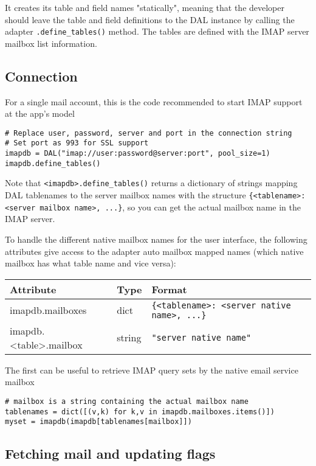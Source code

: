 \documentclass[justified,sixbynine,notoc]{tufte-book}
\def\ft{\small\tt}
\begin{document}
\begin{fullwidth}
It creates its table and field names "statically", meaning that the developer should leave the table and field definitions to the DAL instance by calling the adapter {\ft .define\_tables()} method. The tables are defined with the IMAP server mailbox list information.

\goodbreak\subsection{Connection}

For a single mail account, this is the code recommended to start IMAP support at the app's model

\begin{lstlisting}
# Replace user, password, server and port in the connection string
# Set port as 993 for SSL support
imapdb = DAL("imap://user:password@server:port", pool_size=1)
imapdb.define_tables()
\end{lstlisting}

Note that {\ft <imapdb>.define\_tables()} returns a dictionary of strings mapping DAL tablenames to the server mailbox names with the structure {\ft \{<tablename>: <server mailbox name>, ...\}}, so you can get the actual mailbox name in the IMAP server.

To handle the different native mailbox names for the user interface,  the following attributes give access to the adapter auto mailbox mapped names (which native mailbox has what table name and vice versa):

\goodbreak\begin{center}
{\begin{tabular}{lll}\hline
{\bf Attribute} & {\bf Type} & {\bf Format}\\ \hline
imapdb.mailboxes & dict & {\ft \{<tablename>: <server native name>, ...\}}\\
imapdb.<table>.mailbox & string & {\ft "server native name"} \\ \hline
\end{tabular}}
\end{center}
The first can be useful to retrieve IMAP query sets by the native email service mailbox
\begin{lstlisting}
# mailbox is a string containing the actual mailbox name
tablenames = dict([(v,k) for k,v in imapdb.mailboxes.items()])
myset = imapdb(imapdb[tablenames[mailbox]])
\end{lstlisting}

\goodbreak\subsection{Fetching mail and updating flags}


\end{fullwidth}
\end{document}
